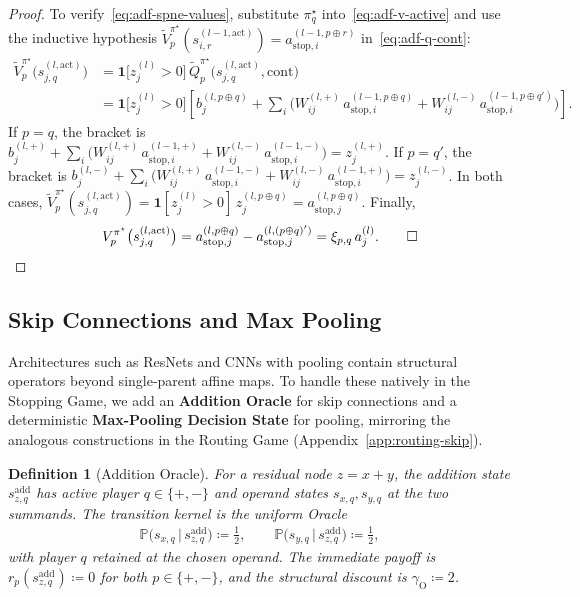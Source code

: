 \documentclass[twoside]{article}
\renewcommand{\P}{\mathbb{P}}
\newcommand{\1}{\mathbf{1}}
\newtheorem{definition}{Definition}
\begin{document}
\begin{proof}
To verify~\eqref{eq:adf-spne-values}, substitute $\pi_q^\star$ into~\eqref{eq:adf-v-active} and use
the inductive hypothesis $\tilde{V}_p^{\pi^\star}(s_{i,r}^{(l-1, \mathrm{act})}) =
    a_{\mathrm{stop},i}^{(l-1, p \oplus r)}$ in~\eqref{eq:adf-q-cont}:
\begin{align}
    \tilde{V}_p^{\pi^\star}\bigl(s_{j,q}^{(l, \mathrm{act})}\bigr)
    &= \1\bigl[z_j^{(l)} > 0\bigr]\, \tilde{Q}_p^{\pi^\star}\bigl(s_{j,q}^{(l, \mathrm{act})},
    \mathrm{cont}\bigr) \\
    &= \1\bigl[z_j^{(l)} > 0\bigr] \left[ b_j^{(l, p \oplus q)} + \sum_i \bigl( W_{ij}^{(l,+)}\,
    a_{\mathrm{stop},i}^{(l-1, p \oplus q)} + W_{ij}^{(l,-)}\, a_{\mathrm{stop},i}^{(l-1, p \oplus q')}
    \bigr) \right].
\end{align}
If $p=q$, the bracket is $b_j^{(l,+)} + \sum_i \bigl( W_{ij}^{(l,+)}\,
    a_{\mathrm{stop},i}^{(l-1,+)} + W_{ij}^{(l,-)}\, a_{\mathrm{stop},i}^{(l-1,-)} \bigr) =
    z_j^{(l,+)}$.
If $p=q'$, the bracket is $b_j^{(l,-)} + \sum_i \bigl( W_{ij}^{(l,+)}\,
    a_{\mathrm{stop},i}^{(l-1,-)} + W_{ij}^{(l,-)}\, a_{\mathrm{stop},i}^{(l-1,+)} \bigr) =
    z_j^{(l,-)}$.
In both cases, $\tilde{V}_p^{\pi^\star}(s_{j,q}^{(l, \mathrm{act})}) = \1[z_j^{(l)} > 0]\, z_j^{(l,
    p \oplus q)} = a_{\mathrm{stop},j}^{(l, p \oplus q)}$. Finally,
\begin{align}
    V_p^{\pi^\star}\bigl(s_{j,q}^{(l, \mathrm{act})}\bigr)
    = a_{\mathrm{stop},j}^{(l, p \oplus q)} - a_{\mathrm{stop},j}^{(l, (p \oplus q)')}
    = \xi_{p,q}\, a_j^{(l)}.
    \qed
\end{align}
\end{proof}

\subsection{Skip Connections and Max Pooling}\label{app:skip-connections}

Architectures such as ResNets and CNNs with pooling contain structural operators beyond
single-parent affine maps. To handle these natively in the Stopping Game, we add an
\textbf{Addition Oracle} for skip connections and a deterministic \textbf{Max-Pooling Decision
State} for pooling, mirroring the analogous constructions in the Routing Game
(Appendix~\ref{app:routing-skip}).

\begin{definition}[Addition Oracle]\label{def:addition-subgame}
For a residual node $z = x + y$, the \emph{addition state} $s_{z,q}^{\mathrm{add}}$ has active
player $q \in \{+,-\}$ and operand states $s_{x,q}, s_{y,q}$ at the two summands. The transition
kernel is the uniform Oracle
\begin{align}
    \P\bigl(s_{x,q} \,\big|\, s_{z,q}^{\mathrm{add}}\bigr) \coloneqq \tfrac{1}{2},
    \qquad
    \P\bigl(s_{y,q} \,\big|\, s_{z,q}^{\mathrm{add}}\bigr) \coloneqq \tfrac{1}{2},
\end{align}
with player $q$ retained at the chosen operand. The immediate payoff is
$r_p(s_{z,q}^{\mathrm{add}}) \coloneqq 0$ for both $p \in \{+,-\}$, and the structural discount is
$\gamma_{\mathrm{O}} \coloneqq 2$.
\end{definition}
\end{document}
